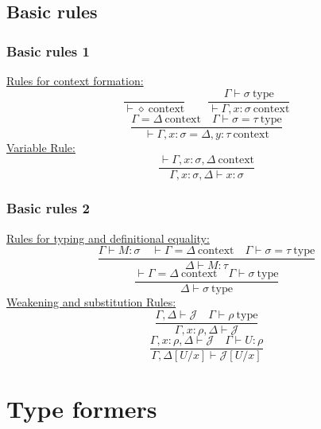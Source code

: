 \documentclass{beamer}
\newcommand{\cntxt}{\ \mathrm{context}}
\newcommand{\typ}{\ \mathrm{type}}
\begin{document}
    \subsection{Basic rules}
    \begin{frame}
        \frametitle{Basic rules 1}
        \underline{Rules for context formation:}
        $$\frac{}{\vdash \diamond \cntxt} \qquad \frac{\Gamma \vdash \sigma \typ}{\vdash \Gamma, x: \sigma \cntxt}$$
        $$\frac{\Gamma = \Delta \cntxt \quad \Gamma \vdash \sigma = \tau \typ}{\vdash \Gamma, x: \sigma = \Delta, y:\tau \cntxt}$$
        \underline{Variable Rule:}
        $$\frac{\vdash \Gamma, x: \sigma, \Delta \cntxt}{\Gamma, x:\sigma,\Delta\vdash x : \sigma}$$
    \end{frame}
    \begin{frame}
        \frametitle{Basic rules 2}
        \underline{Rules for typing and definitional equality:}
        $$\frac{\Gamma \vdash M : \sigma \quad \vdash \Gamma = \Delta \cntxt \quad \Gamma \vdash \sigma = \tau \typ}{\Delta \vdash M : \tau}$$
        $$\frac{\vdash \Gamma = \Delta \cntxt \quad \Gamma \vdash \sigma \typ}{\Delta \vdash \sigma \typ}$$
        \underline{Weakening and substitution Rules:}
        $$\frac{\Gamma, \Delta \vdash \mathcal{J} \quad \Gamma \vdash \rho \typ}{\Gamma, x: \rho, \Delta\vdash \mathcal{J}}$$
        $$\frac{\Gamma,x:\rho,\Delta \vdash \mathcal{J}\quad \Gamma \vdash U: \rho}{\Gamma,\Delta[U/x]\vdash \mathcal{J}[U/x]}$$
    \end{frame}
    \section{Type formers}
\end{document}
